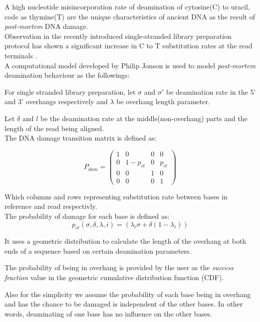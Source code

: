 \documentclass[11pt,a4paper]{report}
\begin{document}
A high nucleotide misincorporation rate of  deamination of cytosine(C) to uracil, 
code as thymine(T) are the unique characteristics of ancient DNA as the result 
of \emph{post-mortem} DNA damage\cite{mapdamage2}\cite{damagepattern}.\\ 

Observation in the recently introduced single-stranded library preparation protocol
has shown a significant increase in C to T substitution rates at the read terminals
\cite{mapdamage2}.\\

A computational model developed by Philip Jonson \cite{mapdamage2} is used to model
\emph{post-mortem} deamination behaviour as the followings:

For single stranded library preparation,
let $\sigma$ and $\sigma\prime $ be deamination rate in the 5' and 3' overhangs 
respectively and $\lambda$ be overhang length parameter. 

Let  $\delta$ and $l$ be the deamination rate at the middle(non-overhang) parts 
and the length of the read being aligned.\\

The DNA damage transition matrix is defined as:

$$ P_{dam} = 
 \begin{pmatrix}
  1 & 0 & 0 & 0 \\
  0 & 1-p_{ct} & 0 & p_{ct} \\
  0  & 0  & 1 & 0  \\
  0 & 0 & 0 & 1 
 \end{pmatrix}$$
 
Which columns and rows representing substitution rate between bases in reference 
and read respectivly.\\
The probability of damage for each base is defined as\cite{mapdamage2}:\\
$$ p_{ct}(\sigma, \delta, \lambda, i) = ( \lambda_{i} \sigma + \delta(1 - \lambda_{i})) $$
 
It uses a geometric distribution to calculate the length of the overhang at both 
ends of a sequence based on certain deamination parameters.

The probability of being in overhang is provided by the user as the \emph{success 
fraction} value in the geometric cumulative distribution function (CDF).

Also for the simplicity we assume the probability of each base being in overhang 
and has the chance to be damaged is independent of the other bases. In other 
words, deaminating of one base has no influence on the other bases.\\
\end{document}

